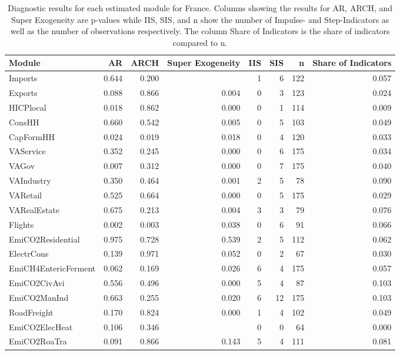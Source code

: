\begin{table}
\centering
\caption{\label{tab:FR_diagnostics}Diagnostic results for each estimated module for France. Columns showing the results for AR, ARCH, and Super Exogeneity are p-values while IIS, SIS, and n show the number of Impulse- and Step-Indicators as well as the number of observations respectively. The column Share of Indicators is the share of indicators compared to n.}
\centering
\begin{tabular}[t]{lrrrrrrr}
\toprule
Module & AR & ARCH & Super Exogeneity & IIS & SIS & n & Share of Indicators\\
\midrule
Imports & 0.644 & 0.200 &  & 1 & 6 & 122 & 0.057\\
Exports & 0.088 & 0.866 & 0.004 & 0 & 3 & 123 & 0.024\\
HICPlocal & 0.018 & 0.862 & 0.000 & 0 & 1 & 114 & 0.009\\
ConsHH & 0.660 & 0.542 & 0.005 & 0 & 5 & 103 & 0.049\\
CapFormHH & 0.024 & 0.019 & 0.018 & 0 & 4 & 120 & 0.033\\
\addlinespace
VAService & 0.352 & 0.245 & 0.000 & 0 & 6 & 175 & 0.034\\
VAGov & 0.007 & 0.312 & 0.000 & 0 & 7 & 175 & 0.040\\
VAIndustry & 0.350 & 0.464 & 0.001 & 2 & 5 & 78 & 0.090\\
VARetail & 0.525 & 0.664 & 0.000 & 0 & 5 & 175 & 0.029\\
VARealEstate & 0.675 & 0.213 & 0.004 & 3 & 3 & 79 & 0.076\\
\addlinespace
Flights & 0.002 & 0.003 & 0.038 & 0 & 6 & 91 & 0.066\\
EmiCO2Residential & 0.975 & 0.728 & 0.539 & 2 & 5 & 112 & 0.062\\
ElectrCons & 0.139 & 0.971 & 0.052 & 0 & 2 & 67 & 0.030\\
EmiCH4EntericFerment & 0.062 & 0.169 & 0.026 & 6 & 4 & 175 & 0.057\\
EmiCO2CivAvi & 0.556 & 0.496 & 0.000 & 5 & 4 & 87 & 0.103\\
\addlinespace
EmiCO2ManInd & 0.663 & 0.255 & 0.020 & 6 & 12 & 175 & 0.103\\
RoadFreight & 0.170 & 0.824 & 0.000 & 1 & 4 & 102 & 0.049\\
EmiCO2ElecHeat & 0.106 & 0.346 &  & 0 & 0 & 64 & 0.000\\
EmiCO2RoaTra & 0.091 & 0.866 & 0.143 & 5 & 4 & 111 & 0.081\\
\bottomrule
\end{tabular}
\end{table}

